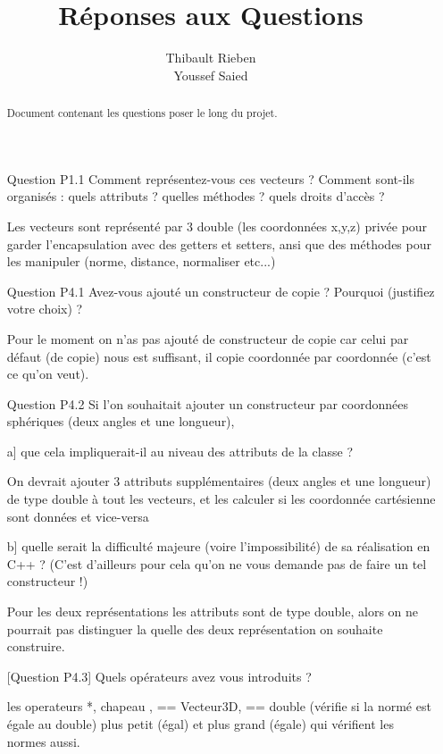 \documentclass[a4paper,10pt]{article}
\title{Réponses aux Questions}
\author{Thibault Rieben \\ Youssef Saied}
\begin{document}
\maketitle

\begin{abstract}

Document contenant les questions poser le long du projet.

\end{abstract}


\begin{itemize}
 \item [Question P1.1] Comment représentez-vous ces vecteurs ? Comment sont-ils organisés : quels attributs ? quelles méthodes ? quels droits d'accès ?

 Les vecteurs sont représenté par 3 double (les coordonnées x,y,z) privée pour garder l'encapsulation avec des getters et setters, ansi que des méthodes pour les manipuler (norme, distance, normaliser etc...)


 \item [Question P4.1] Avez-vous ajouté un constructeur de copie ? Pourquoi (justifiez votre choix) ?

 Pour le moment on n'as pas ajouté de constructeur de copie car celui par défaut (de copie) nous est suffisant, il copie coordonnée par coordonnée (c'est ce qu'on veut).


 \item [Question P4.2] Si l'on souhaitait ajouter un constructeur par coordonnées sphériques (deux angles et une longueur),

a] que cela impliquerait-il au niveau des attributs de la classe ?

On devrait ajouter 3 attributs supplémentaires (deux angles et une longueur) de type double à tout les vecteurs, et les calculer si les coordonnée cartésienne sont données et
vice-versa

b] quelle serait la difficulté majeure (voire l'impossibilité) de sa réalisation en C++ ? (C'est d'ailleurs pour cela qu'on ne vous demande pas de faire un tel constructeur !)

Pour les deux représentations les attributs sont de type double, alors on ne pourrait pas distinguer la quelle des deux représentation on souhaite construire.


[Question P4.3] Quels opérateurs avez vous introduits ?

les operateurs *, chapeau , == Vecteur3D, == double (vérifie si la normé est égale au double) plus petit (égal) et plus grand (égale)  qui vérifient les normes aussi.




\end{itemize}
\end{document}

